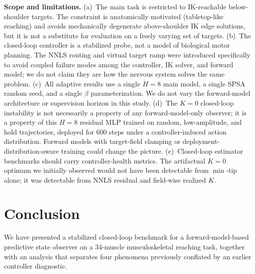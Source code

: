 \documentclass[sn-mathphys,NameDate,iicol]{sn-jnl}
\begin{document}
\noindent\textbf{Scope and limitations.}
(a)~The main task is restricted to IK-reachable below-shoulder
targets. The constraint is anatomically motivated (tabletop-like
reaching) and avoids mechanically degenerate above-shoulder IK edge
solutions, but it is not a substitute for evaluation on a freely
varying set of targets.
(b)~The closed-loop controller is a stabilized probe, not a model of
biological motor planning. The NNLS routing and virtual target ramp
were introduced specifically to avoid coupled failure modes among the
controller, IK solver, and forward model; we do not claim they are how
the nervous system solves the same
problem.
(c)~All adaptive results use a single $H{=}8$ main model, a single
SPSA random seed, and a single $\beta$ parameterization. We do
not vary the forward-model architecture or supervision horizon in this
study.
(d)~The $K\!=\!0$ closed-loop instability is not necessarily a
property of any forward-model-only observer; it is a property of
this $H{=}8$ residual MLP trained on random, low-amplitude, and hold
trajectories, deployed for $600$ steps under a controller-induced
action distribution. Forward models with target-field clamping or
deployment-distribution-aware training could change the picture.
(e)~Closed-loop estimator benchmarks should carry controller-health
metrics. The artifactual $K\!=\!0$ optimum we initially observed
would not have been detectable from $\min$-tip alone; it was
detectable from NNLS residual and field-wise realized $K$.

\section{Conclusion}
\label{sec:conclusion}

We have presented a stabilized closed-loop benchmark for a
forward-model-based predictive state observer on a 34-muscle
musculoskeletal reaching task, together with an analysis that
separates four phenomena previously conflated by an earlier
controller diagnostic.
\end{document}
